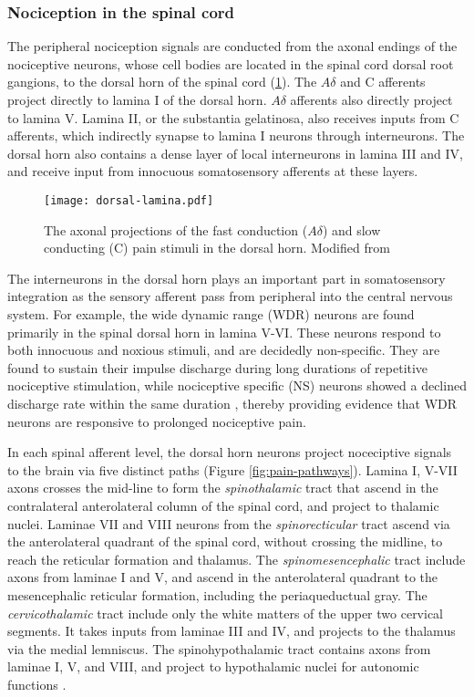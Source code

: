 \subsubsection{Nociception in the spinal cord}

The peripheral nociception signals are conducted from the axonal endings of the nociceptive neurons, whose cell bodies are located in the spinal cord dorsal root gangions, to the dorsal horn of the spinal cord (\ref{fig:drg}). The $A\delta$ and C afferents project directly to lamina I of the dorsal horn. $A\delta$ afferents also directly project to lamina V. Lamina II, or the substantia gelatinosa, also receives inputs from C afferents, which indirectly synapse to lamina I neurons through interneurons. The dorsal horn also contains a dense layer of local interneurons in lamina III and IV, and receive input from innocuous somatosensory afferents at these layers. 

\begin{figure}[ht]
\texttt{[image: dorsal-lamina.pdf]}
\centering
\caption{The axonal projections of the fast conduction ($ A\delta$) and slow conducting (C) pain stimuli in the dorsal horn. Modified from \protect\cite{DMello2008}}
\label{fig:drg}
\end{figure}
 
The interneurons in the dorsal horn plays an important part in somatosensory integration as the sensory afferent pass from peripheral into the central nervous system. For example, the wide dynamic range (WDR) neurons are found primarily in the spinal dorsal horn in lamina V-VI. These neurons respond to both innocuous and noxious stimuli, and are decidedly non-specific. They are found to sustain their impulse discharge during long durations of repetitive nociceptive stimulation, while nociceptive specific (NS) neurons showed a declined discharge rate within the same duration \cite{Coghill1993,Maixner1986}, thereby providing evidence that WDR neurons are responsive to prolonged nociceptive pain. 

In each spinal afferent level, the dorsal horn neurons project noceciptive signals to the brain via five distinct paths (Figure \ref{fig:pain-pathways}). Lamina I, V-VII axons crosses the mid-line to form the \textit{spinothalamic} tract that ascend in the contralateral anterolateral column of the spinal cord, and project to thalamic nuclei. Laminae VII and VIII neurons from the \textit{spinorecticular} tract ascend via the anterolateral quadrant of the spinal cord, without crossing the midline, to reach the reticular formation and thalamus. The \textit{spinomesencephalic} tract include axons from laminae I and V, and ascend in the anterolateral quadrant to the mesencephalic reticular formation, including the periaqueductual gray. The \textit{cervicothalamic} tract include only the white matters of the upper two cervical segments. It takes inputs from laminae III and IV, and projects to the thalamus via the medial lemniscus. The spinohypothalamic tract contains axons from laminae I, V, and VIII, and project to hypothalamic nuclei for autonomic functions \cite{kandel2000principles}. 

